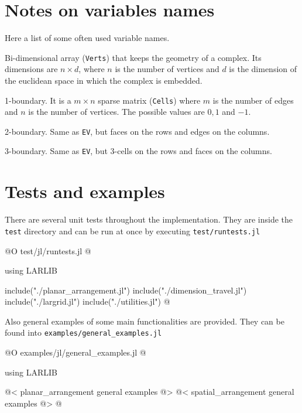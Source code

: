 \section{Notes on variables names}

Here a list of some often used variable names.

\begin{description}[align=right,labelwidth=2em]
    \item [\texttt{V}:]
        Bi-dimensional array (\texttt{Verts}) that keeps the geometry of a complex.
        Its dimensions are $n \times d$, where $n$ is the number of vertices and $d$ is the dimension
        of the euclidean space in which the complex is embedded.
    \item [\texttt{EV}:]
        1-boundary. It is a $m \times n$ sparse matrix (\texttt{Cells}) 
        where $m$ is the number of edges and $n$ is the number of vertices. The possible values
        are $0, 1$ and $-1$.
    \item [\texttt{FE}:]
        2-boundary. Same as \texttt{EV}, but faces on the rows and edges on the columns.
    \item [\texttt{CF}:]
        3-boundary. Same as \texttt{EV}, but 3-cells on the rows and faces on the columns.
\end{description}

\section{Tests and examples}

There are several unit tests throughout the implementation. They
are inside the \texttt{test} directory and can be run at once
by executing \texttt{test/runtests.jl}

@O test/jl/runtests.jl
@{using LARLIB

include("./planar_arrangement.jl")
include("./dimension_travel.jl")
include("./largrid.jl")
include("./utilities.jl")
@}

Also general examples of some main functionalities are provided.
They can be found into \texttt{examples/general\_examples.jl}

@O examples/jl/general_examples.jl
@{using LARLIB

@< planar\_arrangement general examples @>
@< spatial\_arrangement general examples @>
@}